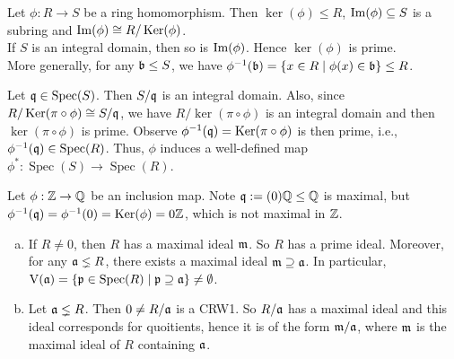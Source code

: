 \begin{fact}
    Let $\phi: R \to S$ be a ring homomorphism. Then $\ker(\phi) \leq R$, $\operatorname{Im}(\phi) \subseteq S$ is a subring and $\operatorname{Im}(\phi) \cong R/\operatorname{Ker}(\phi)$. \\
    If $S$ is an integral domain, then so is $\operatorname{Im}(\phi)$. Hence $\ker(\phi)$ is prime. \\
    More generally, for any $\mathfrak{b} \leq S$, we have $\phi^{-1}(\mathfrak{b}) = \{x \in R \mid \phi(x) \in \mathfrak{b}\} \leq R$.
    \begin{center}
    \end{center}
    Let $\mathfrak{q} \in \operatorname{Spec}(S)$. Then $S/\mathfrak{q}$ is an integral domain. Also, since $R/\operatorname{Ker}(\pi \circ \phi) \cong S/\mathfrak{q}$, we have $R/\ker(\pi \circ \phi)$ is an integral domain and then $\ker(\pi \circ \phi)$ is prime. Observe $\phi^{-1}(\mathfrak{q}) = \operatorname{Ker}(\pi \circ \phi)$ is then prime, i.e., $\phi^{-1}(\mathfrak{q}) \in \operatorname{Spec}(R)$. Thus, $\phi$ induces a well-defined map $\phi^*: \operatorname{Spec}(S) \to \operatorname{Spec}(R)$.
    \end{fact}

\begin{example*}
    Let $\phi: \mathbb{Z} \to \mathbb{Q}$ be an inclusion map. Note $\mathfrak{q} := (0)\mathbb{Q} \leq \mathbb{Q}$ is maximal, but $\phi^{-1}(\mathfrak{q}) = \phi^{-1}(0) = \operatorname{Ker}(\phi) = 0 \mathbb{Z}$, which is not maximal in $\mathbb{Z}$. 
\end{example*}

\begin{fact}
    \begin{enumerate}[(a)]
        \item 
            If $R \neq 0$, then $R$ has a maximal ideal $\mathfrak{m}$. So $R$ has a prime ideal. Moreover, for any $\mathfrak{a} \lneq R$, there exists a maximal ideal $\mathfrak{m} \supseteq \mathfrak{a}$. In particular, $\operatorname{V}(\mathfrak{a}) = \{\mathfrak{p} \in \operatorname{Spec}(R) \mid \mathfrak{p} \supseteq \mathfrak{a}\} \neq \emptyset$. 
        \item 
            Let $\mathfrak{a} \lneq R$. Then $0 \neq R/\mathfrak{a}$ is a CRW1. So $R/\mathfrak{a}$ has a maximal ideal and this ideal corresponds for quoitients, hence it is of the form $\mathfrak{m}/\mathfrak{a}$, where $\mathfrak{m}$ is the maximal ideal of $R$ containing $\mathfrak{a}$.
    \end{enumerate}
\end{fact}

